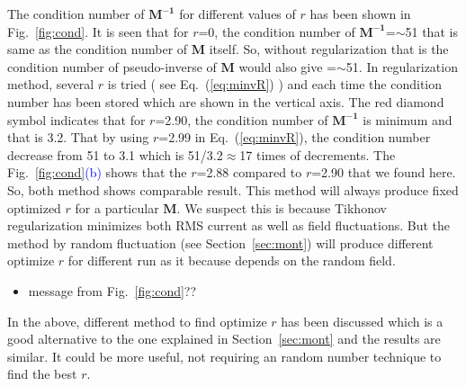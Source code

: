  The condition number of $\bm{M^{-1}}$ for different values of $r$ has been shown in Fig.~\ref{fig:cond}. It is seen that for $r$=0, the condition number of $\bm{M^{-1}}$=$\sim$51 that is same as the condition number of $\bm{M}$ itself. So, without regularization that is the condition number of pseudo-inverse of $\bm{M}$ would also give =$\sim$51. In regularization method, several $r$ is tried ( see Eq.~(\ref{eq:minvR}) ) and each time the condition number has been stored which are shown in the vertical axis. The red diamond symbol indicates that for $r$=2.90, the condition number of $\bm{M^{-1}}$ is minimum and that is 3.2. That by using $r$=2.99 in Eq.~(\ref{eq:minvR}), the condition number decrease from 51 to 3.1 which is 51/3.2$\approx$17 times of decrements. The Fig.~\ref{fig:cond}\textcolor{blue}{(b)} shows that the $r$=2.88 compared to $r$=2.90 that we found here. So, both method shows comparable result. This method will always produce fixed optimized $r$ for a particular  $\bm{M}$. We suspect this is because Tikhonov regularization minimizes both RMS current as well as field fluctuations. But the method by random fluctuation (see Section~\ref{sec:mont}) will produce different optimize $r$ for different run as it because depends on the random field.
 
 \begin{itemize}
     \item message from Fig.~\ref{fig:cond}??
 \end{itemize}

 



In the above, different method to find optimize $r$ has been discussed which is a good alternative to the one explained in Section~\ref{sec:mont} and the results are similar. It could be more useful, not requiring an random number technique to find the best $r$. 



